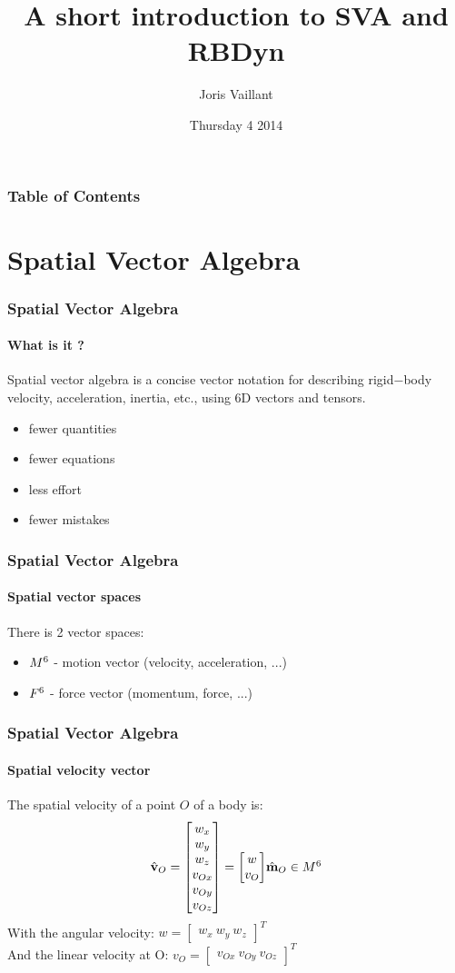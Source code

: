 \documentclass{beamer}
\title
{A short introduction to SVA and RBDyn}
\author
{Joris Vaillant}
\institute{LIRMM}{}
\date{Thursday 4 2014}
\begin{document}
	\frame{\titlepage}

	\begin{frame}
		\frametitle{Table of Contents}
		\tableofcontents
  	\end{frame}


	\section{Spatial Vector Algebra}
  	\begin{frame}
		\frametitle{Spatial Vector Algebra}
		\framesubtitle{What is it ?}
		Spatial vector algebra is a concise vector notation for describing rigid−body velocity,
		acceleration, inertia, etc., using 6D vectors and tensors.
		\begin{itemize}
			\item fewer quantities
			\item fewer equations
			\item less effort
			\item fewer mistakes
		\end{itemize}
  	\end{frame}


  	\begin{frame}
		\frametitle{Spatial Vector Algebra}
		\framesubtitle{Spatial vector spaces}
		There is 2 vector spaces:
		\begin{itemize}
			\item $ M^{6} $ - motion vector (velocity, acceleration, ...)
			\item $ F^{6} $ - force vector (momentum, force, ...)
		\end{itemize}
  	\end{frame}


  	\begin{frame}
		\frametitle{Spatial Vector Algebra}
		\framesubtitle{Spatial velocity vector}
		The spatial velocity of a point $ O $ of a body is:
		\begin{subequations}
			$$
			\velocityvecHatOrigin{O} = \begin{bmatrix} w_x \\ w_y \\ w_z \\ v_{Ox} \\ v_{Oy} \\ v_{Oz} \end{bmatrix} = \begin{bmatrix} w \\ v_O \end{bmatrix}
			$$
			$$
			\motionvecHatOrigin{O} \in \motionspace{6}
			$$
		\end{subequations}
		With the angular velocity:
		$ w = \begin{bmatrix} w_x\ w_y\ w_z \end{bmatrix}^T $\\
		And the linear velocity at O:
		$ v_O = \begin{bmatrix} v_{Ox}\ v_{Oy}\ v_{Oz} \end{bmatrix}^T $
	\end{frame}
\end{document}
